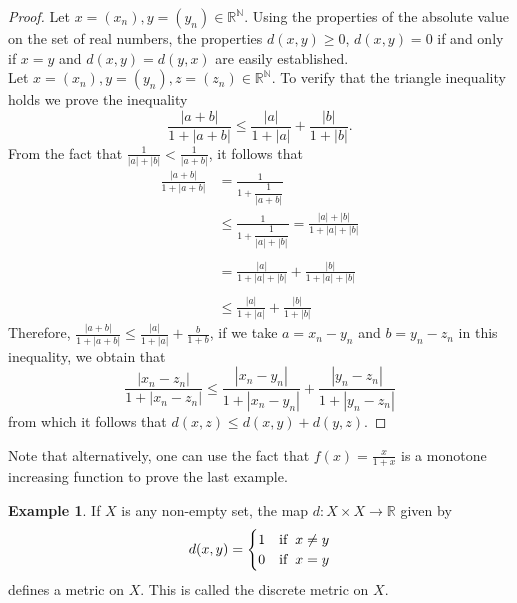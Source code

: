 \documentclass[11pt,a4paper]{article}
\theoremstyle{definition}
\newtheorem{exa}[thm]{Example}
\begin{document}
\begin{proof}
Let $x=(x_n), y=(y_n)\in \mathbb{R}^{\mathbb{N}}$. Using the properties of the absolute value on the set of real numbers, the properties $d(x,y)\geq 0$, $d(x,y)=0$ if and only if $x=y$ and $d(x,y)=d(y,x)$ are easily established.\\ Let $x=(x_n), y=(y_n), z=(z_n)\in \mathbb{R}^{\mathbb{N}}$. To verify that the triangle inequality holds we prove the inequality $$\dfrac{|a+b|}{1+|a+b|}\leq \dfrac{|a|}{1+|a|}+\dfrac{|b|}{1+|b|}.$$ From the fact that $\frac{1}{|a|+|b|}<\frac{1}{|a+b|}$, it follows that
\begin{align*}
\frac{|a+b|}{1+|a+b|} &=\frac{1}{1+\dfrac{1}{|a+b|}}\\
                      &\leq \frac{1}{1+\dfrac{1}{|a|+|b|}}=\frac{|a|+|b|}{1+|a|+|b|}\\\\
                      &=\frac{|a|}{1+|a|+|b|}+\frac{|b|}{1+|a|+|b|}\\\\
                      &\leq \frac{|a|}{1+|a|}+\frac{|b|}{1+|b|}
\end{align*}
Therefore, $\frac{|a+b|}{1+|a+b|}\leq \frac{|a|}{1+|a|}+\frac{b}{1+b}$, if we take $a=x_n-y_n$ and $b=y_n-z_n$ in this inequality, we obtain that
$$\frac{|x_n-z_n|}{1+|x_n-z_n|}\leq \frac{|x_n-y_n|}{1+|x_n-y_n|}+\frac{|y_n-z_n|}{1+|y_n-z_n|}$$
from which it follows that $d(x,z)\leq d(x,y)+d(y,z)$.
\end{proof}

Note that alternatively, one can use the fact that $f(x)=\frac{x}{1+x}$ is a monotone increasing function to prove the last example.













\begin{exa}
If $X$ is any non-empty set, the map $d:X\times X\rightarrow \mathbb{R}$ given by
\[ d(x,y)=
\begin{cases}
1 & \text{if}\hspace{0.2cm} x\neq y\\
0 & \text{if}\hspace{0.2cm} x=y
\end{cases}
\]
defines a metric on $X$. This is called the discrete metric on $X$.
\end{exa}
\end{document}
